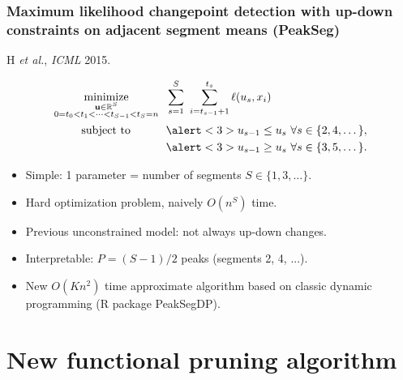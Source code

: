 \documentclass{beamer}
\DeclareMathOperator*{\minimize}{minimize}
\newcommand{\RR}{\mathbb R}
\begin{document}
\begin{frame}
  \frametitle{Maximum likelihood changepoint detection with up-down constraints on adjacent segment means (PeakSeg)}
H {\it et al.}, {\it ICML} 2015. 
    
\vskip -1.5cm
\begin{align*}
    \minimize_{\substack{
  \mathbf u\in\RR^{S}
\\
   0=t_0<t_1<\cdots<t_{S-1}<t_S=n
  }} &\ \ 
    \sum_{s=1}^S\  \sum_{i=t_{s-1}+1}^{t_s} \ell( u_s,  x_i) 
  \label{PeakSegPDPA}
\\
      \text{subject to \hskip 0.75cm} &\ \ \alert<3>{u_{s-1} \leq u_s\ \forall s\in\{2,4,\dots\},}
  \nonumber\\
  &\ \ \alert<3>{u_{s-1} \geq u_s\ \forall s\in\{3,5,\dots\}.}
  \nonumber 
\end{align*}
\vskip -0.4cm
\begin{itemize}  
\item Simple: 1 parameter = number of segments $S\in\{1,3,\dots\}$.
\item Hard optimization problem, naively $O(n^S)$ time.
\item \alert<2>{Previous unconstrained model: not always up-down changes.}
\item \alert<3>{Interpretable: $P=(S-1)/2$ peaks (segments 2, 4, ...).}
\item New $O(Kn^2)$ time approximate algorithm based on classic
  dynamic programming (R package PeakSegDP).
\end{itemize}
\end{frame} 

\section{New functional pruning algorithm}
\end{document}
